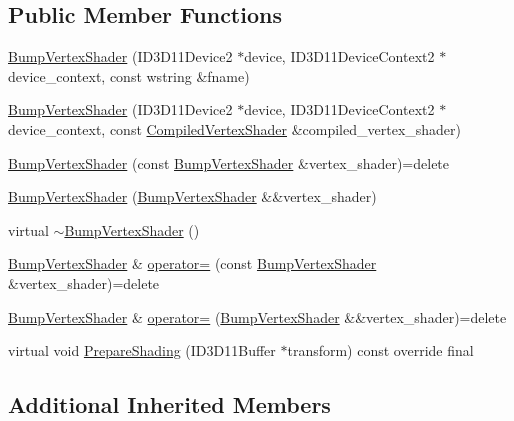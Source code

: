 \subsection*{Public Member Functions}
\begin{DoxyCompactItemize}
\item 
\hyperlink{classmage_1_1_bump_vertex_shader_abaaada10d913e62942d8ac9762a3f897}{Bump\+Vertex\+Shader} (I\+D3\+D11\+Device2 $\ast$device, I\+D3\+D11\+Device\+Context2 $\ast$device\+\_\+context, const wstring \&fname)
\item 
\hyperlink{classmage_1_1_bump_vertex_shader_a1990393c55846a6cbeded8601b495d49}{Bump\+Vertex\+Shader} (I\+D3\+D11\+Device2 $\ast$device, I\+D3\+D11\+Device\+Context2 $\ast$device\+\_\+context, const \hyperlink{structmage_1_1_compiled_vertex_shader}{Compiled\+Vertex\+Shader} \&compiled\+\_\+vertex\+\_\+shader)
\item 
\hyperlink{classmage_1_1_bump_vertex_shader_abb1bc40546871490c44d14dbe17303b2}{Bump\+Vertex\+Shader} (const \hyperlink{classmage_1_1_bump_vertex_shader}{Bump\+Vertex\+Shader} \&vertex\+\_\+shader)=delete
\item 
\hyperlink{classmage_1_1_bump_vertex_shader_aa94f0403d19493070c6b061b5dc76f76}{Bump\+Vertex\+Shader} (\hyperlink{classmage_1_1_bump_vertex_shader}{Bump\+Vertex\+Shader} \&\&vertex\+\_\+shader)
\item 
virtual \hyperlink{classmage_1_1_bump_vertex_shader_aac66d698654ff58a1440cf3dfdcece40}{$\sim$\+Bump\+Vertex\+Shader} ()
\item 
\hyperlink{classmage_1_1_bump_vertex_shader}{Bump\+Vertex\+Shader} \& \hyperlink{classmage_1_1_bump_vertex_shader_a03d0c6105391a294d8e762d9cac600a8}{operator=} (const \hyperlink{classmage_1_1_bump_vertex_shader}{Bump\+Vertex\+Shader} \&vertex\+\_\+shader)=delete
\item 
\hyperlink{classmage_1_1_bump_vertex_shader}{Bump\+Vertex\+Shader} \& \hyperlink{classmage_1_1_bump_vertex_shader_a478db6b064206d32b3b92df43a5a4382}{operator=} (\hyperlink{classmage_1_1_bump_vertex_shader}{Bump\+Vertex\+Shader} \&\&vertex\+\_\+shader)=delete
\item 
virtual void \hyperlink{classmage_1_1_bump_vertex_shader_a11513b06e76e8d3d55f6d96c5a14bdb7}{Prepare\+Shading} (I\+D3\+D11\+Buffer $\ast$transform) const override final
\end{DoxyCompactItemize}
\subsection*{Additional Inherited Members}


